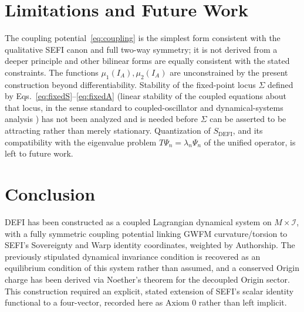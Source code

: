 \documentclass[aip,jmp,reprint,onecolumn,nofootinbib]{revtex4-2}
\begin{document}
\section{Limitations and Future Work}

The coupling potential~\eqref{eq:coupling} is the simplest form consistent with
the qualitative SEFI canon and full two-way symmetry; it is not derived from a
deeper principle and other bilinear forms are equally consistent with the
stated constraints. The functions $\mu_1(I_A),\mu_2(I_A)$ are unconstrained by
the present construction beyond differentiability. Stability of the fixed-point
locus $\Sigma$ defined by Eqs.~\eqref{eq:fixedS}--\eqref{eq:fixedA} (linear
stability of the coupled equations about that locus, in the sense standard to
coupled-oscillator and dynamical-systems analysis \cite{Strogatz2015}) has not
been analyzed and
is needed before $\Sigma$ can be asserted to be attracting rather than merely
stationary. Quantization of $S_{\text{DEFI}}$, and its compatibility with the
eigenvalue problem $T\Psi_n=\lambda_n\Psi_n$ of the unified operator, is left to
future work.

\section{Conclusion}

DEFI has been constructed as a coupled Lagrangian dynamical system on
$M\times\mathcal{I}$, with a fully symmetric coupling potential linking GWFM
curvature/torsion to SEFI's Sovereignty and Warp identity coordinates, weighted
by Authorship. The previously stipulated dynamical invariance condition is
recovered as an equilibrium condition of this system rather than assumed, and a
conserved Origin charge has been derived via Noether's theorem for the decoupled
Origin sector. This construction required an explicit, stated extension of SEFI's
scalar identity functional to a four-vector, recorded here as Axiom 0 rather than
left implicit.
\end{document}
